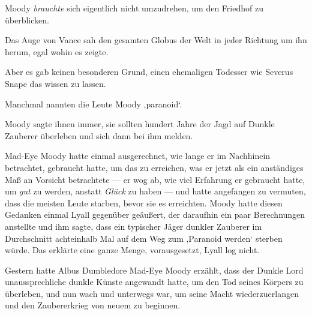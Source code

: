Moody \emph{brauchte} sich eigentlich nicht umzudrehen, um den Friedhof zu überblicken.

Das Auge von Vance sah den gesamten Globus der Welt in jeder Richtung um ihn herum, egal wohin es zeigte.

Aber es gab keinen besonderen Grund, einen ehemaligen Todesser wie Severus Snape das wissen zu lassen.

Manchmal nannten die Leute Moody ‚paranoid‘.

Moody sagte ihnen immer, sie sollten hundert Jahre der Jagd auf Dunkle Zauberer überleben und sich dann bei ihm melden.

Mad-Eye Moody hatte einmal ausgerechnet, wie lange er im Nachhinein betrachtet, gebraucht hatte, um das zu erreichen, was er jetzt als ein anständiges Maß an Vorsicht betrachtete — er wog ab, wie viel Erfahrung er gebraucht hatte, um \emph{gut} zu werden, anstatt \emph{Glück} zu haben — und hatte angefangen zu vermuten, dass die meisten Leute starben, bevor sie es erreichten. Moody hatte diesen Gedanken einmal Lyall gegenüber geäußert, der daraufhin ein paar Berechnungen anstellte und ihm sagte, dass ein typischer Jäger dunkler Zauberer im Durchschnitt achteinhalb Mal auf dem Weg zum ‚Paranoid werden‘ sterben würde. Das erklärte eine ganze Menge, vorausgesetzt, Lyall log nicht.

Gestern hatte Albus Dumbledore Mad-Eye Moody erzählt, dass der Dunkle Lord unaussprechliche dunkle Künste angewandt hatte, um den Tod seines Körpers zu überleben, und nun wach und unterwegs war, um seine Macht wiederzuerlangen und den Zaubererkrieg von neuem zu beginnen.

